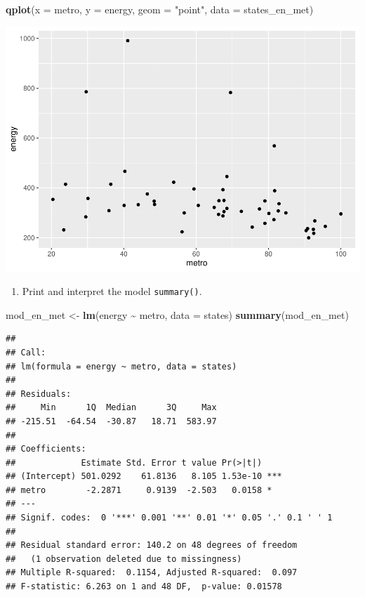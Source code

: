 \documentclass[
]{book}
\newenvironment{Shaded}{\begin{snugshade}}{\end{snugshade}}
\newcommand{\DataTypeTok}[1]{\textcolor[rgb]{0.13,0.29,0.53}{#1}}
\newcommand{\KeywordTok}[1]{\textcolor[rgb]{0.13,0.29,0.53}{\textbf{#1}}}
\newcommand{\NormalTok}[1]{#1}
\newcommand{\OperatorTok}[1]{\textcolor[rgb]{0.81,0.36,0.00}{\textbf{#1}}}
\newcommand{\StringTok}[1]{\textcolor[rgb]{0.31,0.60,0.02}{#1}}
\providecommand{\tightlist}{%
  \setlength{\itemsep}{0pt}\setlength{\parskip}{0pt}}
\begin{document}
\begin{alert}
\begin{Shaded}
\begin{Highlighting}[]
  \KeywordTok{qplot}\NormalTok{(}\DataTypeTok{x =}\NormalTok{ metro, }\DataTypeTok{y =}\NormalTok{ energy, }\DataTypeTok{geom =} \StringTok{"point"}\NormalTok{, }\DataTypeTok{data =}\NormalTok{ states\_en\_met)}
\end{Highlighting}
\end{Shaded}

\includegraphics{R/Rmodels/figures/unnamed-chunk-100-1.pdf}

\begin{enumerate}
\def\labelenumi{\arabic{enumi}.}
\setcounter{enumi}{1}
\tightlist
\item
  Print and interpret the model \texttt{summary()}.
\end{enumerate}

\begin{Shaded}
\begin{Highlighting}[]
\NormalTok{  mod\_en\_met \textless{}{-}}\StringTok{ }\KeywordTok{lm}\NormalTok{(energy }\OperatorTok{\textasciitilde{}}\StringTok{ }\NormalTok{metro, }\DataTypeTok{data =}\NormalTok{ states)}
  \KeywordTok{summary}\NormalTok{(mod\_en\_met)}
\end{Highlighting}
\end{Shaded}

\begin{verbatim}
## 
## Call:
## lm(formula = energy ~ metro, data = states)
## 
## Residuals:
##     Min      1Q  Median      3Q     Max 
## -215.51  -64.54  -30.87   18.71  583.97 
## 
## Coefficients:
##             Estimate Std. Error t value Pr(>|t|)    
## (Intercept) 501.0292    61.8136   8.105 1.53e-10 ***
## metro        -2.2871     0.9139  -2.503   0.0158 *  
## ---
## Signif. codes:  0 '***' 0.001 '**' 0.01 '*' 0.05 '.' 0.1 ' ' 1
## 
## Residual standard error: 140.2 on 48 degrees of freedom
##   (1 observation deleted due to missingness)
## Multiple R-squared:  0.1154, Adjusted R-squared:  0.097 
## F-statistic: 6.263 on 1 and 48 DF,  p-value: 0.01578
\end{verbatim}


\end{alert}
\end{document}
